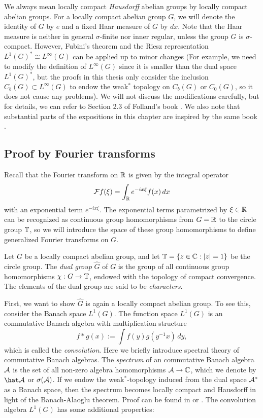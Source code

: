 \documentclass[a4paper]{article}
\begin{document}
We always mean locally compact \emph{Hausdorff} abelian groups by locally compact abelian groups.
For a locally compact abelian group $G$, we will denote the identity of $G$ by $e$ and a fixed Haar measure of $G$ by $dx$.
Note that the Haar measure is neither in general $\sigma$-finite nor inner regular, unless the group $G$ is $\sigma$-compact.
However, Fubini's theorem and the Riesz representation $L^1(G)^*\cong L^\infty(G)$ can be applied up to minor changes (For example, we need to modify the definition of $L^\infty(G)$ since it is smaller than the dual space $L^1(G)^*$, but the proofs in this thesis only consider the inclusion $C_b(G)\subset L^\infty(G)$ to endow the weak$^*$ topology on $C_b(G)$ or $C_0(G)$, so it does not cause any problems).
We will not discuss the modifications carefully, but for details, we can refer to Section 2.3 of Folland's book \cite{folland2016course}.
We also note that substantial parts of the expositions in this chapter are inspired by the same book \cite{folland2016course}.

\subsection{Proof by Fourier transforms}

Recall that the Fourier transform on $\mathbb{R}$ is given by the integral operator
\[\mathcal{F} f(\xi)=\int_{\mathbb{R}} e^{-ix\xi}f(x)\,dx\]
with an exponential term $e^{-ix\xi}$.
The exponential terms parametrized by $\xi\in\mathbb{R}$ can be recognized as continuous group homomorphisms from $G=\mathbb{R}$ to the circle group $\mathbb{T}$, so we will introduce the space of these group homomorphisms to define generalized Fourier transforms on $G$.

\begin{defn}
Let $G$ be a locally compact abelian group, and let $\mathbb{T}=\{z\in\mathbb{C}:|z|=1\}$ be the circle group.
The \emph{dual group} $\hat G$ of $G$ is the group of all continuous group homomorphisms $\chi:G\to\mathbb{T}$, endowed with the topology of compact convergence.
The elements of the dual group are said to be \emph{characters}.
\end{defn}

First, we want to show $\hat G$ is again a locally compact abelian group.
To see this, consider the Banach space $L^1(G)$.
The function space $L^1(G)$ is an commutative Banach algebra with multiplication structure
\[f*g(x):=\int f(y)g(y^{-1}x)\,dy,\]
which is called the \emph{convolution}.
Here we briefly introduce spectral theory of commutative Banach algebras.
The \emph{spectrum} of an commutative Banach algebra $\mathcal{A}$ is the set of all non-zero algebra homomorphisms $\mathcal{A}\to\mathbb{C}$, which we denote by $\hat\cA$ or $\sigma(\mathcal{A})$.
If we endow the weak$^*$-topology induced from the dual space $\mathcal{A}^*$ as a Banach space, then the spectrum becomes locally compact and Hausdorff in light of the Banach-Alaoglu theorem.
Proof can be found in \cite{murphy2014c} or \cite{conway2019course}.
The convolution algebra $L^1(G)$ has some additional properties:
\end{document}
